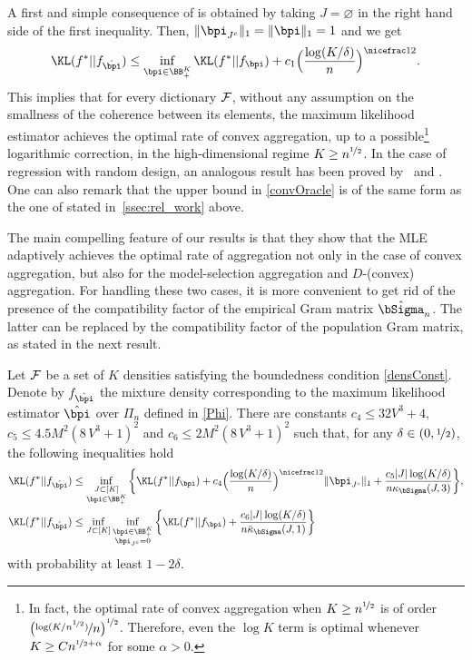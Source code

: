 A first and simple consequence of  is obtained by taking $J=\varnothing$ in the right hand
side of the first inequality. Then, $\|\bpi_{J^c}\|_1=\|\bpi\|_1=1$ and we get
\begin{equation}
  \KL(f^*|| f_{\hat\bpi}) \leq \inf_{\bpi \in \BB_+^K}
  \KL(f^*|| f_{\bpi}) + c_1\Big(\frac{\log(K/\delta)}{n}\Big)^{\nicefrac12}.\label{convOracle}
\end{equation}
This implies that for every dictionary $\cal F$, without any assumption on the smallness of the coherence 
between its elements, the maximum likelihood estimator achieves the optimal rate of convex aggregation, up
to a possible\footnote{In fact, the optimal rate of convex aggregation when $K\ge n^{\nicefrac12}$ is of
order $\normalsize\big(\nicefrac{\log(K/n^{\nicefrac12})}{\displaystyle n}\big)^{\nicefrac12}$. Therefore, even the 
$\log K$ term is optimal whenever $K\ge C n^{\nicefrac12+\alpha}$ for some $\alpha>0$.} logarithmic 
correction, in the high-dimensional regime $K\ge n^{\nicefrac12}$. In the case of regression with random 
design, an analogous result has been proved by~\cite{LecueMend13} and \cite{Lecue13}. 
One can also remark that the upper bound in \eqref{convOracle} is of the same form as the one of  
stated in~\cref{ssec:rel_work} above.

The main compelling feature  of our results is that they show that the MLE adaptively achieves the optimal rate of
aggregation not only in the case of convex aggregation, but also for the model-selection aggregation and $D$-(convex)
aggregation. For handling these two cases, it is more convenient to get rid of the presence of the compatibility
factor of the empirical Gram matrix $\hat\bSigma_n$.  The latter can be replaced by the compatibility factor of
the population Gram matrix, as stated in the next result.

\begin{theorem}
\label{maintheo2}
Let $\cal F$ be a set of $K$ densities satisfying the boundedness condition \eqref{densConst}.
Denote by $f_{\hat\bpi}$ the mixture density corresponding to the maximum likelihood estimator
$\hat\bpi$ over $\Pi_n$ defined in \eqref{Phi}. There are constants $c_4\le 32V^3 + 4$,
$c_5\le 4.5M^2(8\,V^3+1)^2$ and $c_6\le 2M^2(8\,V^3+1)^2$ such that, for any
$\delta \in (0,\nicefrac12)$, the following inequalities hold
\begin{align}
  \KL(f^*|| f_{\hat\bpi}) &\leq \inf_{\substack{J\subset [K]\\ \bpi \in \BB_+^K}}
		\bigg\{ \KL(f^*|| f_{\bpi}) + c_4\Big(\frac{\log(K/\delta)}{n}\Big)^{\nicefrac12} \|\bpi_{J^c}\|_1 +
			\frac{c_5|J|\log(K/\delta)}{n\kappa_{\bSigma}(J,3)} \bigg\},\label{boundDevThree}\\
 \KL(f^*|| f_{\hat\bpi}) &\leq \inf_{J\subset [K]}\inf_{\substack{\bpi \in \BB_+^K\\ \bpi_{J^c}=0}}
		\bigg\{ \KL(f^*|| f_{\bpi}) +
			\frac{c_6|J|\log(K/\delta)}{n\bar\kappa_{\bSigma}(J,1)} \bigg\}\label{boundDevFour}
\end{align}
with probability at least $1-2\delta$.
\end{theorem}

